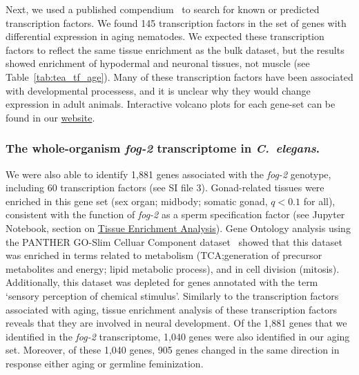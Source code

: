 \documentclass[10pt,letterpaper,twocolumn]{article}
\newcommand{\cel}{\emph{C.~elegans}}
\newcommand{\fog}{\emph{\mbox{fog-2}}}
\newcommand{\fogn}{1,881}
\newcommand{\coexpressed}{905}
\newcommand{\intersectn}{1,040}
\newcommand{\tfaging}{145}
\newcommand{\tffog}{60}
\newcommand{\webref}{
\href{https://wormlabcaltech.github.io/Angeles_Leighton_2016/}{website}}
\begin{document}
Next, we used a published compendium~\cite{Reece-Hoyes2005} to search for known
or predicted transcription factors. We found \tfaging{} transcription factors in
the set of genes with differential expression in aging nematodes. We expected
these transcription factors to reflect the same tissue enrichment as the bulk
dataset, but the results showed enrichment of hypodermal and neuronal tissues,
not muscle (see Table~\ref{tab:tea_tf_age}). Many of these transcription factors
have been  associated with developmental processess, and it is unclear why they
would change expression in adult animals. Interactive volcano plots for each
gene-set can be found in our \webref{}.

\subsubsection*{The whole-organism \fog{} transcriptome in \cel{}.}

We were also able to identify \fogn{} genes associated with the \fog{} genotype,
including \tffog{} transcription factors (see SI file 3). Gonad-related tissues
were enriched in this gene set (sex organ; midbody; somatic gonad, $q < 0.1$
for all), consistent with the function of \fog{} as a sperm specification factor
(see Jupyter Notebook, section on
\href{https://wormlabcaltech.github.io/Angeles_Leighton_2016/RNASeqAnalysis.html#Run-TEA}{Tissue Enrichment Analysis}).
Gene Ontology analysis using the PANTHER GO-Slim Celluar Component
dataset~\cite{Mi2009} showed that this dataset was enriched in terms related to
metabolism (TCA;\@ generation of precursor metabolites and energy; lipid
metabolic process), and in cell division (mitosis). Additionally, this dataset
was depleted for genes annotated with the term `sensory perception of chemical
stimulus'.  Similarly to the transcription factors associated with aging, tissue
enrichment analysis of these transcription factors reveals that they are involved
in neural development. Of the \fogn{} genes that we identified in the \fog{}
transcriptome, \intersectn{} genes were also identified in our aging set.
Moreover, of these \intersectn{}  genes, \coexpressed{} genes changed in the
same direction in response either aging or germline feminization.
\end{document}
